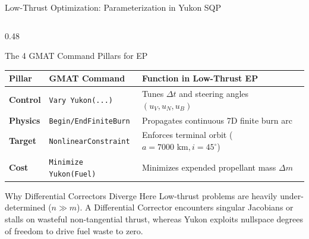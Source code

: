 \documentclass[aspectratio=169, 10pt]{beamer}
\begin{document}
\begin{frame}{Low-Thrust Optimization: Parameterization in Yukon SQP}
\begin{columns}[T]
        \begin{column}{0.48\textwidth}
            \begin{block}{The 4 GMAT Command Pillars for EP}
                \centering
                \vspace{1pt}
                \fontsize{5.2pt}{6.2pt}\selectfont
                \setlength{\tabcolsep}{2.5pt}
                \renewcommand{\arraystretch}{1.2}
                \begin{tabular}{lll}
                    \toprule
                    \textbf{Pillar} & \textbf{GMAT Command} & \textbf{Function in Low-Thrust EP} \\ \midrule
                    \textbf{Control} & \texttt{Vary Yukon(...)} & Tunes $\Delta t$ and steering angles $(u_V, u_N, u_B)$ \\
                    \textbf{Physics} & \texttt{Begin/EndFiniteBurn} & Propagates continuous 7D finite burn arc \\
                    \textbf{Target}  & \texttt{NonlinearConstraint} & Enforces terminal orbit ($a = 7000\text{ km}, i = 45^\circ$) \\
                    \textbf{Cost}    & \texttt{Minimize Yukon(Fuel)} & Minimizes expended propellant mass $\Delta m$ \\
                    \bottomrule
                \end{tabular}
                \vspace{2pt}
            \end{block}
            \vspace{-0.15cm}
            \begin{alertblock}{Why Differential Correctors Diverge Here}
                \scriptsize
                Low-thrust problems are heavily under-determined ($n \gg m$). A Differential Corrector encounters singular Jacobians or stalls on wasteful non-tangential thrust, whereas Yukon exploits nullspace degrees of freedom to drive fuel waste to zero.
            \end{alertblock}
        \end{column}
    \end{columns}
\end{frame}
\end{document}

